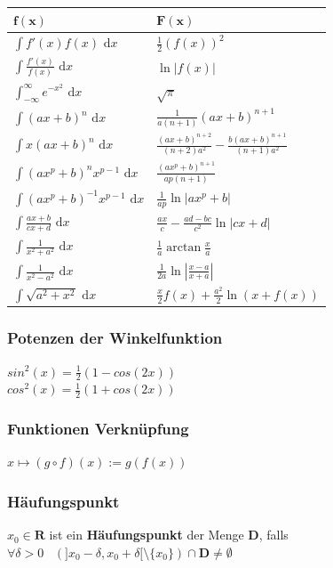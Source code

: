 \documentclass[8pt]{extarticle}
\def\dx{\text{ d}x}
\def\dx{\text{ d}x}
\begin{document}
\begin{multicols*}{3}
\begin{center}
\begin{tabularx}{\linewidth}{>{\centering\arraybackslash}X>{\centering\arraybackslash}X}
  $\mathbf{f(x)}$ & $\mathbf{F(x)}$ \\
  \midrule
  $\int f'(x) f(x) \dx$ & $\frac{1}{2}(f(x))^2$ \\
  $\int \frac{f'(x)}{f(x)} \dx$ & $\ln|f(x)|$ \\
  $\int_{-\infty}^\infty e^{-x^2} \dx$ & $\sqrt{\pi}$ \\
  $\int (ax+b)^n \dx$ & $\frac{1}{a(n+1)}(ax+b)^{n+1}$ \\
  $\int x(ax+b)^n \dx$ & $\frac{(ax+b)^{n+2}}{(n+2)a^2} - \frac{b(ax+b)^{n+1}}{(n+1)a^2}$ \\
  $\int (ax^p+b)^n x^{p-1} \dx$ & $\frac{(ax^p+b)^{n+1}}{ap(n+1)}$ \\
  $\int (ax^p + b)^{-1} x^{p-1} \dx$ & $\frac{1}{ap} \ln |ax^p + b|$ \\
  $\int \frac{ax+b}{cx+d} \dx$ & $\frac{ax}{c} - \frac{ad-bc}{c^2} \ln |cx +d|$ \\
  $\int \frac{1}{x^2+a^2} \dx$ & $\frac{1}{a} \arctan \frac{x}{a}$ \\
  $\int \frac{1}{x^2 - a^2} \dx$ & $\frac{1}{2a} \ln\left| \frac{x-a}{x+a} \right|$ \\
  $\int \sqrt{a^2+x^2} \dx $ & $\frac{x}{2}f(x) + \frac{a^2}{2}\ln(x+f(x))$ \\
  \bottomrule
 \end{tabularx}
\end{center}

    \subsubsection {Potenzen der Winkelfunktion}
  
  $sin^2(x) = \frac{1}{2} (1 - cos(2x))$\\
  $cos^2(x) = \frac{1}{2} (1 + cos(2x))$

    \subsubsection {Funktionen Verknüpfung}
  
  $
    x \mapsto (g \circ f)(x) := g(f(x))
  $

    \subsubsection {Häufungspunkt}
  
  $x_0 \in \mathbf{R}$ ist ein \textbf{Häufungspunkt} der Menge $\mathbf{D}$,
  falls $\forall \delta > 0 \;\;\; (]x_0 - \delta, x_0 + \delta[ \setminus \{x_0\}) \cap \mathbf{D} \neq \emptyset$


\end{multicols*}
\end{document}
